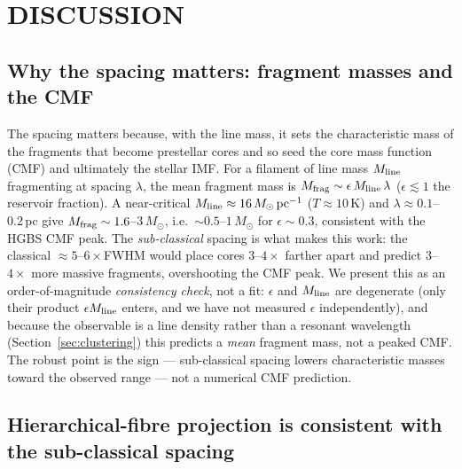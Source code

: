 \documentclass[usenatbib,twoside,twocolumn]{mnras}
\begin{document}
\section{DISCUSSION}
\label{sec:discussion}

\subsection{Why the spacing matters: fragment masses and the CMF}
\label{sec:cmf}
The spacing matters because, with the line mass, it sets the characteristic mass of the fragments that become prestellar cores and so seed the core mass function (CMF) and ultimately the stellar IMF. For a filament of line mass $M_{\rm line}$ fragmenting at spacing $\lambda$, the mean fragment mass is $M_{\rm frag}\sim\epsilon\,M_{\rm line}\,\lambda$ ($\epsilon\lesssim1$ the reservoir fraction). A near-critical $M_{\rm line}\approx16\,M_\odot\,{\rm pc^{-1}}$ ($T\approx10$\,K) and $\lambda\approx0.1$--$0.2$\,pc give $M_{\rm frag}\sim1.6$--$3\,M_\odot$, i.e.\ $\sim0.5$--$1\,M_\odot$ for $\epsilon\sim0.3$, consistent with the HGBS CMF peak. The \emph{sub-classical} spacing is what makes this work: the classical $\approx5$--$6\times$FWHM would place cores $3$--$4\times$ farther apart and predict $3$--$4\times$ more massive fragments, overshooting the CMF peak. We present this as an order-of-magnitude \emph{consistency check}, not a fit: $\epsilon$ and $M_{\rm line}$ are degenerate (only their product $\epsilon M_{\rm line}$ enters, and we have not measured $\epsilon$ independently), and because the observable is a line density rather than a resonant wavelength (Section~\ref{sec:clustering}) this predicts a \emph{mean} fragment mass, not a peaked CMF. The robust point is the sign --- sub-classical spacing lowers characteristic masses toward the observed range --- not a numerical CMF prediction.


\subsection{Hierarchical-fibre projection is consistent with the sub-classical spacing}
\label{sec:fibre_projection}
\end{document}
